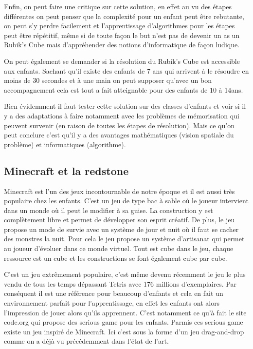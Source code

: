 Enfin, on peut faire une critique sur cette solution, en effet au vu des étapes différentes on peut penser que la complexité pour un enfant peut être rebutante, on peut s'y perdre facilement et l'apprentissage d'algorithmes pour les étapes peut être répétitif, même si de toute façon le but n'est pas de devenir un as un Rubik's Cube mais d'appréhender des notions d'informatique de façon ludique. 

On peut également se demander si la résolution du Rubik's Cube est accessible aux enfants. Sachant qu'il existe des enfants de 7 ans qui arrivent à le résoudre en moins de 30 secondes et à une main \cite{55} on peut supposer qu'avec un bon accompagnement cela est tout a fait atteignable pour des enfants de 10 à 14ans.

Bien évidemment il faut tester cette solution sur des classes d'enfants et voir si il y a des adaptations à faire notamment avec les problèmes de mémorisation qui peuvent survenir (en raison de toutes les étapes de résolution). Mais ce qu'on peut conclure c'est qu'il y a des avantages mathématiques (vision spatiale du problème) et informatiques (algorithme).

\newpage

\subsection{Minecraft et la redstone}

Minecraft est l'un des jeux incontournable de notre époque et il est aussi très populaire chez les enfants. C'est un jeu de type bac à sable où le joueur intervient dans un monde où il peut le modifier à sa guise. La construction y est complètement libre et permet de développer son esprit créatif. De plus, le jeu propose un mode de survie avec un système de jour et nuit où il faut se cacher des monstres la nuit. Pour cela le jeu propose un système d'artisanat qui permet au joueur d'évoluer dans ce monde virtuel. Tout est cube dans le jeu, chaque ressource est un cube et les constructions se font également cube par cube.

C'est un jeu extrêmement populaire, c'est même devenu récemment le jeu le plus vendu de tous les temps dépassant Tetris avec 176 millions d'exemplaires. \cite{56} Par conséquent il est une référence pour beaucoup d'enfants et cela en fait un environnement parfait pour l'apprentissage, en effet les enfants ont alors l'impression de jouer alors qu'ils apprennent. C'est notamment ce qu'à fait le site code.org qui propose des serious game pour les enfants. Parmis ces serious game existe un jeu inspiré de Minecraft. Ici c'est sous la forme d'un jeu drag-and-drop comme on a déjà vu précédemment dans l'état de l'art. \cite{57}

